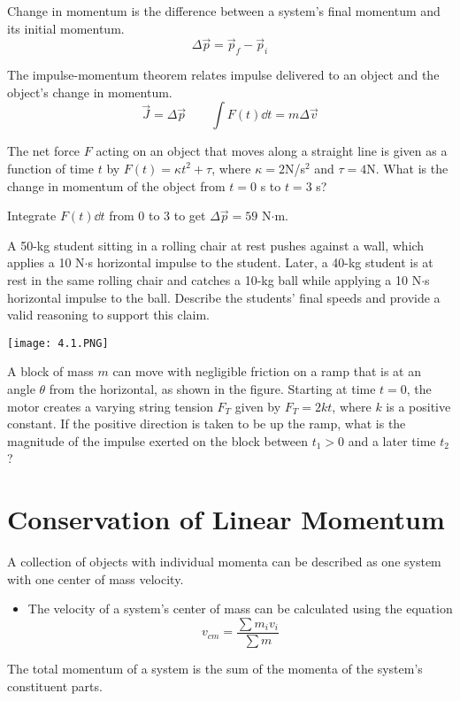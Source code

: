 \documentclass[../mech.tex]{subfiles}
\begin{document}
Change in momentum is the difference between a system's final momentum and its initial momentum.
\[ \Delta \vec{p} = \vec{p}_f-\vec{p}_i \]

The impulse-momentum theorem relates impulse delivered to an object and the object's change in momentum.
\[ \vec{J}=\Delta \vec{p} \qquad \int F(t)\dd t = m\Delta \vec{v} \]

\begin{example}
    The net force $F$ acting on an object that moves along a straight line is given as a function of time $t$ by $F(t)=\kappa t^2+\tau$, where $\kappa = 2$N/s$^2$ and $\tau=4$N. What is the change in momentum of the object from $t=0$ s to $t=3$ s?

    Integrate $F(t)\dd t$ from $0$ to $3$ to get $\Delta \vec{p} = 59$ N$\cdot$m.
\end{example}

\ex A 50-kg student sitting in a rolling chair at rest pushes against a wall, which applies a 10 N$\cdot$s horizontal impulse to the student. Later, a 40-kg student is at rest in the same rolling chair and catches a 10-kg ball while applying a 10 N$\cdot$s horizontal impulse to the ball. 
Describe the students' final speeds and provide a valid reasoning to support this claim.

\ex \begin{center}
    \texttt{[image: 4.1.PNG]}
\end{center}
A block of mass $m$ can move with negligible friction on a ramp that is at an angle $\theta$ from the horizontal, as shown in the figure. Starting at time $t=0$, the motor creates a varying string tension $F_T$ given by $F_T=2kt$, where $k$ is a positive constant.
If the positive direction is taken to be up the ramp, what is the magnitude of the impulse exerted on the block between $t_1>0$ and a later time $t_2$?

\section{Conservation of Linear Momentum}
A collection of objects with individual momenta can be described as one system with one center of mass velocity.
\begin{itemize}
    \item The velocity of a system's center of mass can be calculated using the equation 
    \[ v_{cm}=\frac{\sum m_iv_i}{\sum m} \]
\end{itemize}
The total momentum of a system is the sum of the momenta of the system's constituent parts.
\end{document}

